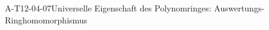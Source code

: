 
\begin{PROP}{A-T12-04-07}{Universelle Eigenschaft des Polynomringes: Auswertungs-Ringhomomorphismus}
\end{PROP}
